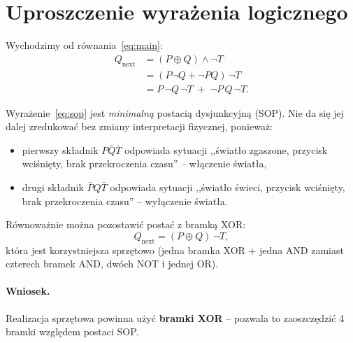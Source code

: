 \section{Uproszczenie wyrażenia logicznego}
\label{sec:uproszczenie}

Wychodzimy od równania~\eqref{eq:main}:
\begin{align}
    Q_{\text{next}}
    &= (P \oplus Q)\land \lnot T \nonumber\\
    &= (P\lnot Q + \lnot P Q)\,\lnot T \nonumber\\
    &= P\,\lnot Q\,\lnot T \;+\; \lnot P\,Q\,\lnot T .
    \label{eq:sop}
\end{align}

Wyrażenie~\eqref{eq:sop} jest \emph{minimalną} postacią
dysjunkcyjną (SOP). Nie da się jej dalej zredukować bez zmiany
interpretacji fizycznej, ponieważ:
\begin{itemize}
    \item pierwszy składnik $P\bar Q\bar T$ odpowiada sytuacji
          ,,światło zgaszone, przycisk wciśnięty, brak przekroczenia czasu''
          – włączenie światła,
    \item drugi składnik $\bar P Q\bar T$ odpowiada sytuacji
          ,,światło świeci, przycisk wciśnięty, brak przekroczenia czasu''
          – wyłączenie światła.
\end{itemize}

Równoważnie można pozostawić postać z bramką XOR:
\begin{equation}
    Q_{\text{next}} = (P \oplus Q)\,\lnot T,
\end{equation}
która jest korzystniejsza sprzętowo (jedna bramka XOR + jedna AND
zamiast czterech bramek AND, dwóch NOT i jednej OR).

\paragraph{Wniosek.} Realizacja sprzętowa powinna użyć
\textbf{bramki XOR} – pozwala to zaoszczędzić 4 bramki względem
postaci SOP.